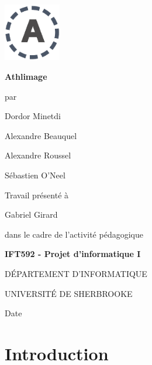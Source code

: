 \documentclass[12pt,fleqn]{article}
\renewcommand{\baselinestretch}{1.5}
\begin{document}
\def\always{{\vcenter{\vbox{\hrule height.4pt
                   \hbox{\vrule width.4pt height9pt \kern9pt
                         \vrule width.4pt}
                         \hrule height.4pt}}}}

\def\undertext#1{$\underline{\hbox{#1}}$}



\begin{center}
\includegraphics[height=2.5cm,width=2.5cm]{images/Athlimage-logo.png}
\end{center}


\begin{center}
{\bf\LARGE    Athlimage }
\vspace{1cm}

par
\vspace{1cm}

Dordor Minetdi 

Alexandre Beauquel

Alexandre Roussel 

Sébastien O'Neel

\vspace{1cm}
{\large Travail présenté à

Gabriel Girard

\vspace{0.5cm}

 dans le cadre de l'activité pédagogique
 \vspace{0.3cm}


{\bf IFT592 - Projet d'informatique I}


\vspace{1cm}


D\'EPARTEMENT D'INFORMATIQUE

UNIVERSIT\'E DE SHERBROOKE

\vspace{0.5cm}


Date}

\end{center}

\newpage

\renewcommand{\baselinestretch}{1.2}
\normalsize


\tableofcontents

\newpage

\section{Introduction}
\end{document}
